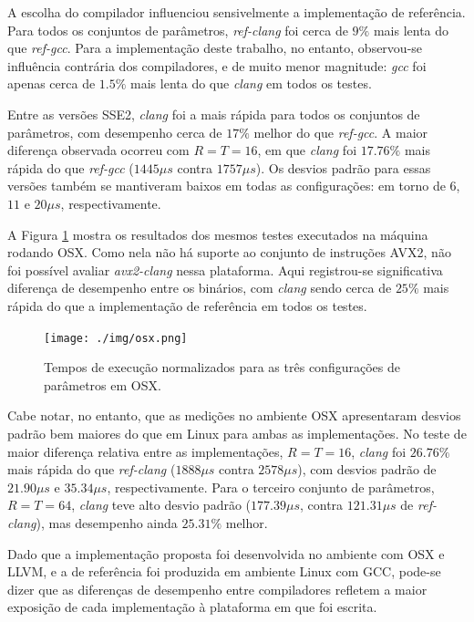 \documentclass{article}
\begin{document}
A escolha do compilador influenciou sensivelmente a implementação de
referência. Para todos os conjuntos de parâmetros, \emph{ref-clang} foi cerca
de $9\%$ mais lenta do que \emph{ref-gcc}. Para a implementação deste trabalho,
no entanto, observou-se influência contrária dos compiladores, e de muito menor
magnitude: \emph{gcc} foi apenas cerca de $1.5\%$ mais lenta do que \emph{clang}
em todos os testes.

Entre as versões SSE2, \emph{clang} foi a mais rápida para todos os conjuntos
de parâmetros, com desempenho cerca de $17\%$ melhor do que \emph{ref-gcc}. A
maior diferença observada ocorreu com $R = T = 16$, em que \emph{clang} foi
$17.76\%$ mais rápida do que \emph{ref-gcc} ($1445 \mu s$ contra $1757 \mu s$).
Os desvios padrão para essas versões também se mantiveram baixos em todas as
configurações: em torno de $6$, $11$ e $20 \mu s$, respectivamente.

A Figura \ref{results-osx} mostra os resultados dos mesmos testes
executados na máquina rodando OSX. Como nela não há suporte ao conjunto
de instruções AVX2, não foi possível avaliar \emph{avx2-clang} nessa
plataforma. Aqui registrou-se significativa diferença de desempenho entre os
binários, com \emph{clang} sendo cerca de $25\%$ mais rápida do que a
implementação de referência em todos os testes.

\begin{figure}[htbp]
\centering
\texttt{[image: ./img/osx.png]}
\caption{Tempos de execução normalizados para as três configurações de
parâmetros em OSX\label{results-osx}.}
\end{figure}

Cabe notar, no entanto, que as medições no ambiente OSX apresentaram desvios
padrão bem maiores do que em Linux para ambas as implementações. No teste de
maior diferença relativa entre as implementações, $R = T = 16$, \emph{clang} foi
$26.76\%$ mais rápida do que \emph{ref-clang} ($1888 \mu s$ contra $2578 \mu
s$), com desvios padrão de $21.90 \mu s$ e $35.34 \mu s$, respectivamente. Para
o terceiro conjunto de parâmetros, $R = T = 64$, \emph{clang} teve alto desvio
padrão ($177.39 \mu s$, contra $121.31 \mu s$ de \emph{ref-clang}), mas
desempenho ainda $25.31\%$ melhor.

Dado que a implementação proposta foi desenvolvida no ambiente com OSX e
LLVM, e a de referência foi produzida em ambiente Linux com GCC,
pode-se dizer que as diferenças de desempenho entre compiladores
refletem a maior exposição de cada implementação à plataforma em que foi
escrita.
\end{document}
